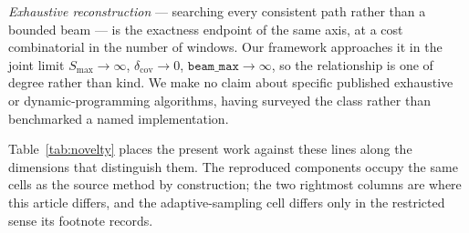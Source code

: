\documentclass[preprint,11pt]{elsarticle}
\newcommand{\dcov}{\delta_{\mathrm{cov}}}
\newcommand{\Smax}{S_{\max}}
\newcommand{\beammax}{\texttt{beam\_max}}
\begin{document}
\emph{Exhaustive reconstruction} --- searching every consistent path
rather than a bounded beam --- is the exactness endpoint of the same axis,
at a cost combinatorial in the number of windows. Our framework
approaches it in the joint limit $\Smax\to\infty$, $\dcov\to0$,
$\beammax\to\infty$, so the relationship is one of degree rather than
kind. We make no claim about specific published exhaustive or
dynamic-programming algorithms, having surveyed the class rather than
benchmarked a named implementation.

Table~\ref{tab:novelty} places the present work against these lines
along the dimensions that distinguish them. The reproduced components
occupy the same cells as the source method by construction; the two
rightmost columns are where this article differs, and the adaptive-sampling
cell differs only in the restricted sense its footnote records.
\end{document}
